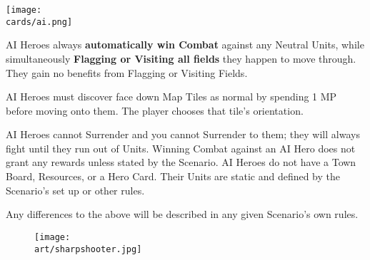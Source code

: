 \begin{multicols}{2}
\begin{center}
  \texttt{[image: \\cards/ai.png]}
\end{center}

AI Heroes always \textbf{automatically win Combat} against any Neutral Units, while simultaneously \textbf{Flagging or Visiting all fields} they happen to move through.
They gain no benefits from Flagging or Visiting Fields.

AI Heroes must discover face down Map Tiles as normal by spending 1 MP before moving onto them.
The player chooses that tile's orientation.\par
AI Heroes cannot Surrender and you cannot Surrender to them;
they will always fight until they run out of Units.
Winning Combat against an AI Hero does not grant any rewards unless stated by the Scenario.
AI Heroes do not have a Town Board, Resources, or a Hero Card.
Their Units are static and defined by the Scenario's set up or other rules.\par
Any differences to the above will be described in any given Scenario's own rules.


\end{multicols}

\vspace*{\fill}
\begin{figure*}[!hb]
  \centering
  \texttt{[image: \\art/sharpshooter.jpg]}
\end{figure*}

\clearpage

